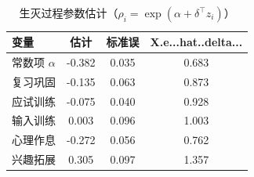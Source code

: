 \begin{table}[htbp]
\centering
\small
\caption{生灭过程参数估计（$\rho_i=\exp(\alpha+\delta^{\top}z_i)$）}
\label{tab:ctmcpar}
\begin{tabular}{lccc}
\toprule
变量 & 估计 & 标准误 & X.e...hat..delta... \\
\midrule
常数项 $\alpha$ & -0.382 & 0.035 & 0.683 \\
复习巩固 & -0.135 & 0.063 & 0.873 \\
应试训练 & -0.075 & 0.040 & 0.928 \\
输入训练 & 0.003 & 0.096 & 1.003 \\
心理作息 & -0.272 & 0.056 & 0.762 \\
兴趣拓展 & 0.305 & 0.097 & 1.357 \\
\bottomrule
\end{tabular}
\end{table}
